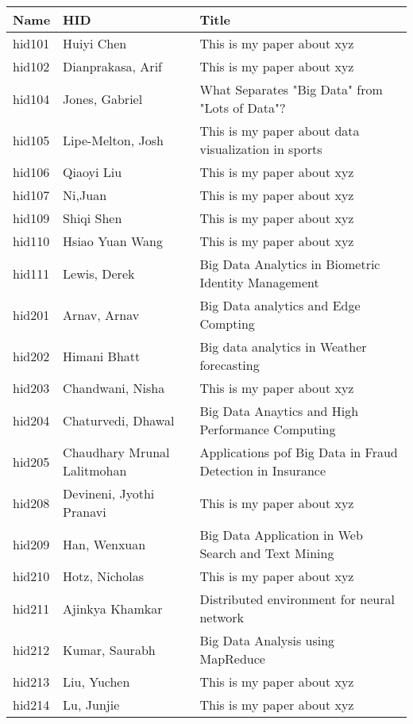 \documentclass[12pt]{article}
\begin{document}
\begin{footnotesize}
\begin{longtable}{|p{1cm}p{5cm}p{9cm}|}
\hline \textbf{Name} & \textbf{HID} & \textbf{Title} \\ \hline \hline

hid101 & Huiyi Chen & This is my paper about xyz  \\
\hline
hid102 & Dianprakasa, Arif & This is my paper about xyz  \\
\hline
hid104 & Jones, Gabriel & What Separates "Big Data" from "Lots of Data"?  \\
\hline
hid105 & Lipe-Melton, Josh & This is my paper about data visualization in sports  \\
\hline
hid106 & Qiaoyi Liu & This is my paper about xyz  \\
\hline
hid107 & Ni,Juan & This is my paper about xyz  \\
\hline
hid109 & Shiqi Shen & This is my paper about xyz  \\
\hline
hid110 & Hsiao Yuan Wang & This is my paper about xyz  \\
\hline
hid111 & Lewis, Derek & Big Data Analytics in Biometric Identity Management  \\
\hline
hid201 & Arnav, Arnav & Big Data analytics and Edge Compting  \\
\hline
hid202 & Himani Bhatt & Big data analytics in Weather forecasting  \\
\hline
hid203 & Chandwani, Nisha & This is my paper about xyz  \\
\hline
hid204 & Chaturvedi, Dhawal & Big Data Anaytics and High Performance Computing  \\
\hline
hid205 & Chaudhary Mrunal Lalitmohan & Applications pof Big Data in Fraud Detection in Insurance  \\
\hline
hid208 & Devineni, Jyothi Pranavi & This is my paper about xyz  \\
\hline
hid209 & Han, Wenxuan & Big Data Application in Web Search and Text Mining  \\
\hline
hid210 & Hotz, Nicholas & This is my paper about xyz  \\
\hline
hid211 & Ajinkya Khamkar & Distributed environment for neural network  \\
\hline
hid212 & Kumar, Saurabh & Big Data Analysis using MapReduce  \\
\hline
hid213 & Liu, Yuchen & This is my paper about xyz  \\
\hline
hid214 & Lu, Junjie & This is my paper about xyz  \\

\end{longtable}
\end{footnotesize}
\end{document}
